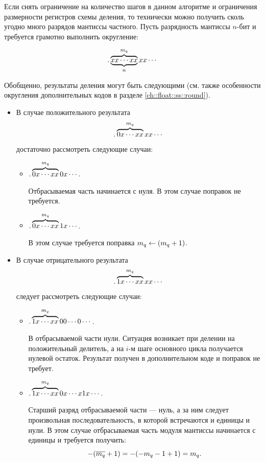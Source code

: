 Если снять ограничение на количество шагов в данном алгоритме и ограничения размерности регистров схемы деления, то технически можно получить сколь угодно много разрядов мантиссы частного. Пусть разрядность мантиссы $n$-бит и требуется грамотно выполнить округление:

\[
    .\underbrace{\overbrace{xx\cdots xx}^{m_{q}}}_n xx\cdots
\]

Обобщенно, результаты деления могут быть следующими (см. также особенности округления дополнительных кодов в разделе \ref{ch::float::ss::round}).
\begin{itemize}
    \item В случае положительного результата
    \[.\overbrace{0x\cdots xx}^{m_{q}} xx\cdots\]
    достаточно рассмотреть следующие случаи:
    
    \begin{itemize}
        \item $.\overbrace{0x\cdots xx}^{m_{q}} 0x\cdots$.
        
        Отбрасываемая часть начинается с нуля. В этом случае поправок не требуется.

        \item $.\overbrace{0x\cdots xx}^{m_{q}} 1x\cdots$.
        
        В этом случае требуется поправка $m_{q}\gets(m_{q}+1)$.
    \end{itemize}
    
    \item В случае отрицательного результата
    \[.\overbrace{1x\cdots xx}^{m_{q}} xx\cdots\]
    следует рассмотреть следующие случаи:
    
    \begin{itemize}
        \item $.\overbrace{1x\cdots xx}^{m_{q}} 00\cdots 0\cdots$.
        
        В отбрасываемой части нули. Ситуация возникает при делении на положительный делитель, а на $i$-м шаге основного цикла получается нулевой остаток. Результат получен в дополнительном коде и поправок не требует.
        
        \item $.\overbrace{1x\cdots xx}^{m_{q}} 0x\cdots x1x\cdots$.
        
        Старший разряд отбрасываемой части --- нуль, а за ним следует произвольная последовательность, в которой встречаются и единицы и нули. В этом случае отбрасываемая часть модуля мантиссы начинается с единицы и требуется получить:
        \[
            -(\overline{m_{q}}+1)=-(-m_{q}-1+1)=m_{q}.
        \]
        

\end{itemize}
\end{itemize}
